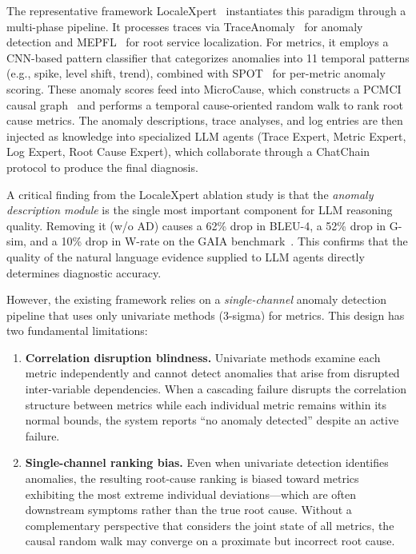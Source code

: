 \documentclass[a4paper,fleqn]{cas-dc}
\begin{document}
The representative framework LocaleXpert~\cite{11449471} instantiates this paradigm through a multi-phase pipeline.  It processes traces via TraceAnomaly~\cite{9251058} for anomaly detection and MEPFL~\cite{10.1145/3338906.3338961} for root service localization.  For metrics, it employs a CNN-based pattern classifier that categorizes anomalies into 11 temporal patterns (e.g., spike, level shift, trend), combined with SPOT~\cite{10.1145/3097983.3098144} for per-metric anomaly scoring.  These anomaly scores feed into MicroCause, which constructs a PCMCI causal graph~\cite{9213058} and performs a temporal cause-oriented random walk to rank root cause metrics.  The anomaly descriptions, trace analyses, and log entries are then injected as knowledge into specialized LLM agents (Trace Expert, Metric Expert, Log Expert, Root Cause Expert), which collaborate through a ChatChain protocol to produce the final diagnosis.

A critical finding from the LocaleXpert ablation study is that the \emph{anomaly description module} is the single most important component for LLM reasoning quality.  Removing it (w/o AD) causes a 62\% drop in BLEU-4, a 52\% drop in G-sim, and a 10\% drop in W-rate on the GAIA benchmark~\cite{11449471}.  This confirms that the quality of the natural language evidence supplied to LLM agents directly determines diagnostic accuracy.

However, the existing framework relies on a \emph{single-channel} anomaly detection pipeline that uses only univariate methods (3-sigma) for metrics.  This design has two fundamental limitations:

\begin{enumerate}[leftmargin=*]
  \item \textbf{Correlation disruption blindness.}  Univariate methods examine each metric independently and cannot detect anomalies that arise from disrupted inter-variable dependencies.  When a cascading failure disrupts the correlation structure between metrics while each individual metric remains within its normal bounds, the system reports ``no anomaly detected'' despite an active failure.

  \item \textbf{Single-channel ranking bias.}  Even when univariate detection identifies anomalies, the resulting root-cause ranking is biased toward metrics exhibiting the most extreme individual deviations---which are often downstream symptoms rather than the true root cause.  Without a complementary perspective that considers the joint state of all metrics, the causal random walk may converge on a proximate but incorrect root cause.
\end{enumerate}
\end{document}
